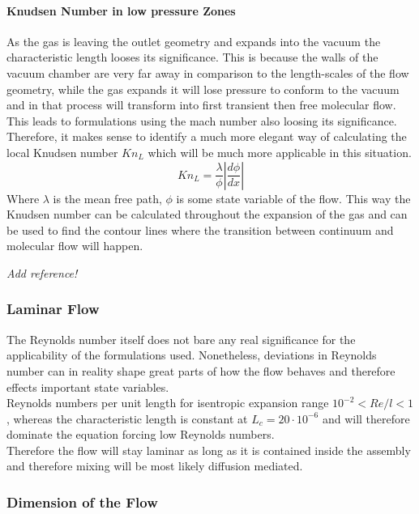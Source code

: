 \paragraph{Knudsen Number in low pressure Zones}

	As the gas is leaving the outlet geometry and expands into the vacuum the characteristic length looses its significance.
	This is because the walls of the vacuum chamber are very far away in comparison to the length-scales of the flow geometry, while the gas expands it will lose pressure to conform to the vacuum and in that process will transform into first transient then free molecular flow.
	This leads to formulations using the mach number also loosing its significance.
	Therefore, it makes sense to identify a much more elegant way of calculating the local Knudsen number $Kn_L$ which will be much more applicable in this situation.
	$$
		K n_L = \frac{\lambda}{\phi} \left| \frac{d\phi}{dx} \right|
	$$
	Where $\lambda$ is the mean free path, $\phi$ is some state variable of the flow.
	This way the Knudsen number can be calculated throughout the expansion of the gas and can be used to find the contour lines where the transition between continuum and molecular flow will happen. 

{\color{greenColor}\itshape
Add reference!
}

\subsubsection{Laminar Flow}

	The Reynolds number itself does not bare any real significance for the applicability of the formulations used. Nonetheless, deviations in Reynolds number can in reality shape great parts of how the flow behaves and therefore effects important state variables.\\
	Reynolds numbers per unit length for isentropic expansion range $10^{-2} < Re/l < 1$, whereas the characteristic length is constant at $L_c = 20\cdot 10^{-6}$ and will therefore dominate the equation forcing low Reynolds numbers. \cite{ames1953compressible}\\
	Therefore the flow will stay laminar as long as it is contained inside the assembly and therefore mixing will be most likely diffusion mediated.
	\cite{comsol_microfluidics_guide}
	
\subsubsection{Dimension of the Flow}

